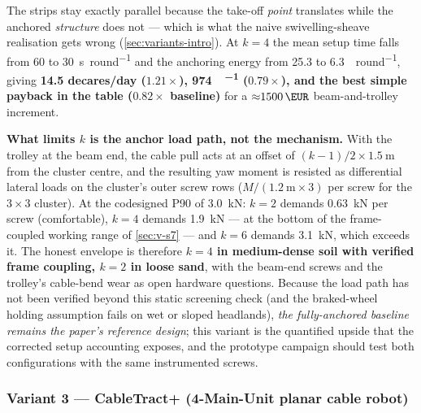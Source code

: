 \documentclass[11pt,a4paper]{article}
\begin{document}
The strips stay exactly parallel because the take-off \emph{point} translates while the anchored \emph{structure} does not --- which is what the naive swivelling-sheave realisation gets wrong (\cref{sec:variants-intro}). At $k=4$ the mean setup time falls from \SI{60}{} to \SI{30}{\second\per round} and the anchoring energy from \SI{25.3}{} to \SI{6.3}{\Wh\per round}, giving \textbf{14.5 decares/day ($1.21\times$), \SI{974}{\Wh\per\decare} ($0.79\times$), and the best simple payback in the table ($0.82\times$ baseline)} for a ${\approx}\SI{1500}{\EUR}$ beam-and-trolley increment.

\textbf{What limits $k$ is the anchor load path, not the mechanism.} With the trolley at the beam end, the cable pull acts at an offset of $(k-1)/2 \times \SI{1.5}{\meter}$ from the cluster centre, and the resulting yaw moment is resisted as differential lateral loads on the cluster's outer screw rows ($M / (\SI{1.2}{\meter} \times 3)$ per screw for the $3\times3$ cluster). At the codesigned P90 of \SI{3.0}{\kilo\newton}: $k=2$ demands \SI{0.63}{\kilo\newton} per screw (comfortable), $k=4$ demands \SI{1.9}{\kilo\newton} --- at the bottom of the frame-coupled working range of \cref{sec:v-s7} --- and $k=6$ demands \SI{3.1}{\kilo\newton}, which exceeds it. The honest envelope is therefore \textbf{$k=4$ in medium-dense soil with verified frame coupling, $k=2$ in loose sand}, with the beam-end screws and the trolley's cable-bend wear as open hardware questions. Because the load path has not been verified beyond this static screening check (and the braked-wheel holding assumption fails on wet or sloped headlands), \emph{the fully-anchored baseline remains the paper's reference design}; this variant is the quantified upside that the corrected setup accounting exposes, and the prototype campaign should test both configurations with the same instrumented screws.

\subsubsection{Variant 3 --- CableTract+ (4-Main-Unit planar cable robot)}\label{sec:variant-plus}
\end{document}
